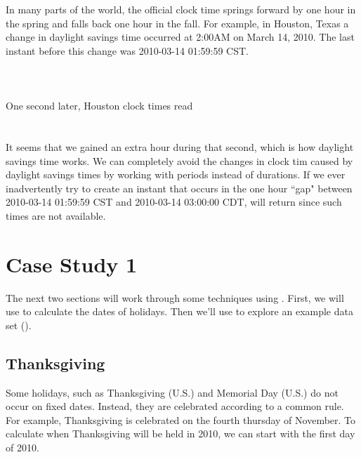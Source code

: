 \documentclass[article]{jss}
\begin{document}
In many parts of the world, the official clock time springs forward by one hour in the spring and falls back one hour in the fall. For example, in Houston, Texas a change in daylight savings time occurred at 2:00AM on March 14, 2010. The last instant before this change was 2010-03-14 01:59:59 CST.\\

\\
\\
\\

One second later, Houston clock times read\\

\\
\\

It seems that we gained an extra hour during that second, which is how daylight savings time works. We can completely avoid the changes in clock tim caused by daylight savings times by working with periods instead of durations. If we ever inadvertently try to create an instant that occurs in the one hour ``gap" between 2010-03-14 01:59:59 CST  and 2010-03-14 03:00:00 CDT,  will return  since such times are not available.

\section{Case Study 1}

The next two sections will work through some techniques using . First, we will use  to calculate the dates of  holidays. Then we'll use  to explore an example data set ().

\subsection{Thanksgiving}
Some holidays, such as Thanksgiving (U.S.) and Memorial Day (U.S.) do not occur on fixed dates. Instead, they are celebrated according to a common rule. For example, Thanksgiving is celebrated on the fourth thursday of November. To calculate when Thanksgiving will be held in 2010, we can start with the first day of 2010.\\

\\
\\
\end{document}
